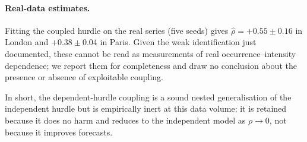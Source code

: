 \documentclass[11pt,a4paper]{article}
\begin{document}
\paragraph{Real-data estimates.} Fitting the coupled hurdle on the real series
(five seeds) gives $\widehat\rho=+0.55\pm0.16$ in London and $+0.38\pm0.04$ in
Paris. Given the weak identification just documented, these cannot be read as
measurements of real occurrence--intensity dependence; we report them for
completeness and draw no conclusion about the presence or absence of exploitable
coupling.

In short, the dependent-hurdle coupling is a sound nested generalisation of the
independent hurdle but is empirically inert at this data volume: it is retained
because it does no harm and reduces to the independent model as $\rho\to0$, not
because it improves forecasts.
\end{document}
